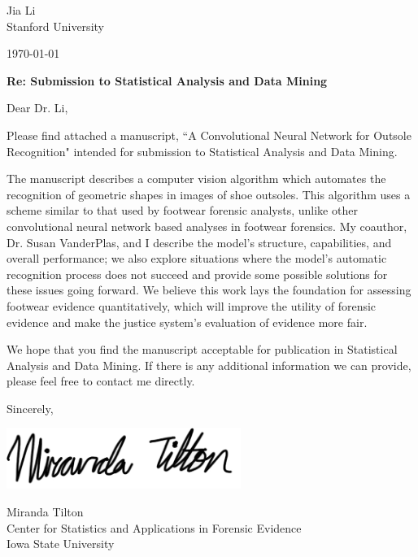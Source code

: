 \documentclass[11pt]{article}
\begin{document}
Jia Li \\
Stanford University

\vspace{2em}

\today\\\vspace{1em}

{\bf Re: Submission to Statistical Analysis and Data Mining}\\\vspace{2em}

Dear Dr. Li, \vspace{1em}

Please find attached a manuscript, ``A Convolutional Neural Network for Outsole Recognition" intended for submission to Statistical Analysis and Data Mining. \vspace{1em}

The manuscript describes a computer vision algorithm which automates the recognition of geometric shapes in images of shoe outsoles. This algorithm uses a scheme similar to that used by footwear forensic analysts, unlike other convolutional neural network based analyses in footwear forensics. My coauthor, Dr. Susan VanderPlas, and I describe the model's structure, capabilities, and overall performance; we also explore situations where the model's automatic recognition process does not succeed and provide some possible solutions for these issues going forward. We believe this work lays the foundation for assessing footwear evidence quantitatively, which will improve the utility of forensic evidence and make the justice system's evaluation of evidence more fair. \vspace{1em}

We hope that you find the manuscript acceptable for publication in Statistical Analysis and Data Mining. If there is any additional information we can provide, please feel free to contact me directly. \vspace{0.25in}

Sincerely,\\
\begin{minipage}{.25\linewidth}
\vspace*{.5cm}
\includegraphics[width=3in,keepaspectratio=TRUE]{signature}
\vspace*{.5cm}
\end{minipage}

Miranda Tilton\\
Center for Statistics and Applications in Forensic Evidence\\
Iowa State University
\end{document}
